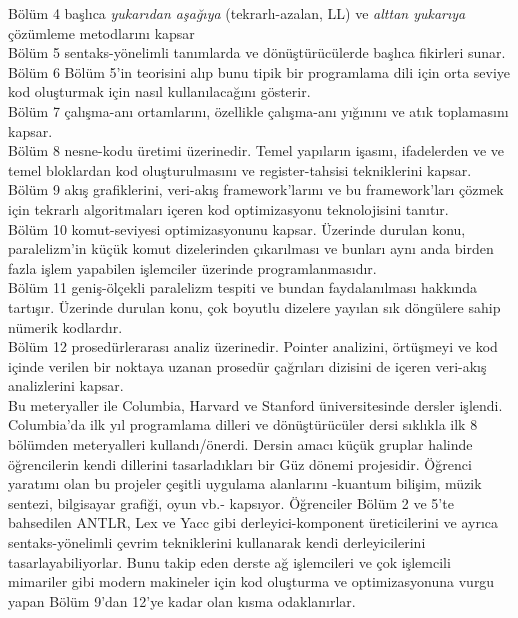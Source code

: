 Bölüm 4 başlıca \textit{yukarıdan aşağıya} (tekrarlı-azalan, LL) ve \textit{alttan yukarıya} çözümleme metodlarını kapsar
\\

Bölüm 5 sentaks-yönelimli tanımlarda ve dönüştürücülerde başlıca fikirleri sunar.
\\

Bölüm 6 Bölüm 5'in teorisini alıp bunu tipik bir programlama dili için orta seviye kod oluşturmak için nasıl kullanılacağını gösterir.
\\

Bölüm 7 çalışma-anı ortamlarını, özellikle çalışma-anı yığınını ve atık toplamasını kapsar.
\\

Bölüm 8 nesne-kodu üretimi üzerinedir. Temel yapıların işasını, ifadelerden ve ve temel bloklardan kod oluşturulmasını ve register-tahsisi tekniklerini kapsar.
\\

Bölüm 9 akış grafiklerini, veri-akış framework'larını ve bu framework'ları çözmek için tekrarlı algoritmaları içeren kod optimizasyonu teknolojisini tanıtır.
\\

Bölüm 10 komut-seviyesi optimizasyonunu kapsar. Üzerinde durulan konu, paralelizm'in küçük komut dizelerinden çıkarılması ve bunları aynı anda birden fazla işlem yapabilen işlemciler üzerinde programlanmasıdır.
\\

Bölüm 11 geniş-ölçekli paralelizm tespiti ve bundan faydalanılması hakkında tartışır. Üzerinde durulan konu, çok boyutlu dizelere yayılan sık döngülere sahip nümerik kodlardır.
\\

Bölüm 12 prosedürlerarası analiz üzerinedir. Pointer analizini, örtüşmeyi ve kod içinde verilen bir noktaya uzanan prosedür çağrıları dizisini de içeren veri-akış analizlerini kapsar.
\\

Bu meteryaller ile Columbia, Harvard ve Stanford üniversitesinde dersler işlendi. Columbia'da ilk yıl programlama dilleri ve dönüştürücüler dersi sıklıkla ilk 8 bölümden meteryalleri kullandı/önerdi. Dersin amacı küçük gruplar halinde öğrencilerin kendi dillerini tasarladıkları bir Güz dönemi projesidir. Öğrenci yaratımı olan bu projeler çeşitli uygulama alanlarını -kuantum bilişim, müzik sentezi, bilgisayar grafiği, oyun vb.- kapsıyor. Öğrenciler Bölüm 2 ve 5'te bahsedilen ANTLR, Lex ve Yacc gibi derleyici-komponent üreticilerini ve ayrıca sentaks-yönelimli çevrim tekniklerini kullanarak kendi derleyicilerini tasarlayabiliyorlar. Bunu takip eden derste ağ işlemcileri ve çok işlemcili mimariler gibi modern makineler için kod oluşturma ve optimizasyonuna vurgu yapan   Bölüm 9'dan 12'ye kadar olan kısma odaklanırlar.

